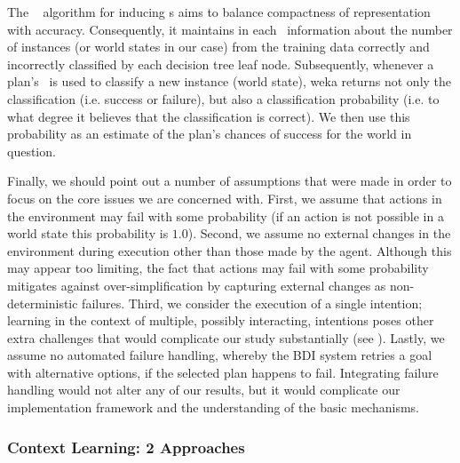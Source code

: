 The \weka\  algorithm for inducing \dt{}s aims to balance
compactness of representation with accuracy. Consequently, it maintains in each
\dt\ information about the number of instances (or world states in our case) from
the training data correctly and incorrectly classified by each decision tree leaf
node. Subsequently, whenever a plan's \dt\ is used to classify a new instance
(world state), weka returns not only the classification (i.e. success or
failure), but also a classification probability (i.e. to what degree it believes
that the classification is correct). We then use this probability as an estimate
of the plan's chances of success for the world in question.


Finally, we should point out a number of assumptions that were made in order to
focus on the core issues we are concerned with.
First, we assume that actions in the environment may fail with some probability
(if an action is not possible in a world state this probability is $1.0$).
Second, we assume no external changes in the environment during execution other
than those made by the agent. Although this may appear too limiting, the fact
that actions may fail with some probability mitigates against
over-simplification by capturing external changes as
non-deterministic failures.
Third, we consider the execution of a single intention; learning in the context
of multiple, possibly interacting, intentions poses other extra challenges that
would complicate our study substantially (see \cite{Thangarajah02}).
Lastly, we assume no automated failure handling, whereby the BDI system retries
a goal with alternative options, if the selected plan happens to fail. 
Integrating failure handling would not alter any of our results, but it would
complicate our implementation framework and the understanding of the basic
mechanisms.



\subsubsection{Context Learning: 2 Approaches}\label{sec:context_learning}

\newcommand{\success}{\mbox{\emph{succ}}}
\newcommand{\failure}{\mbox{\emph{fail}}}

